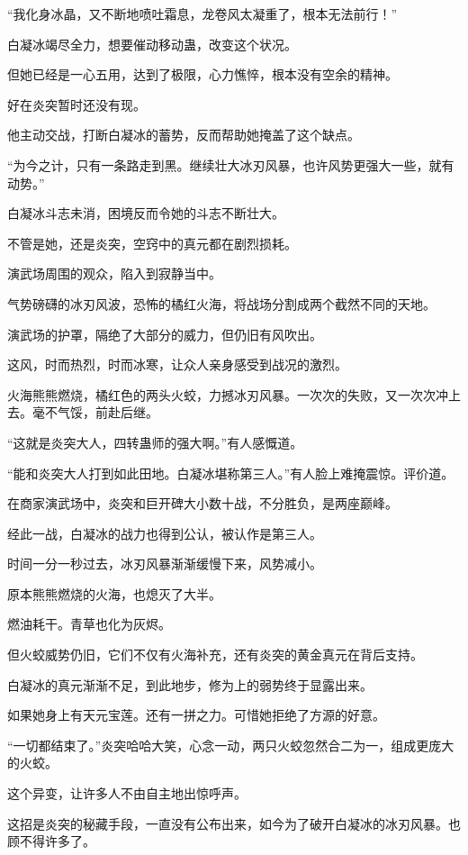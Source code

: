 \begin{this_body}
“我化身冰晶，又不断地喷吐霜息，龙卷风太凝重了，根本无法前行！”

白凝冰竭尽全力，想要催动移动蛊，改变这个状况。

但她已经是一心五用，达到了极限，心力憔悴，根本没有空余的精神。

好在炎突暂时还没有现。

他主动交战，打断白凝冰的蓄势，反而帮助她掩盖了这个缺点。

“为今之计，只有一条路走到黑。继续壮大冰刃风暴，也许风势更强大一些，就有动势。”

白凝冰斗志未消，困境反而令她的斗志不断壮大。

不管是她，还是炎突，空窍中的真元都在剧烈损耗。

演武场周围的观众，陷入到寂静当中。

气势磅礴的冰刃风波，恐怖的橘红火海，将战场分割成两个截然不同的天地。

演武场的护罩，隔绝了大部分的威力，但仍旧有风吹出。

这风，时而热烈，时而冰寒，让众人亲身感受到战况的激烈。

火海熊熊燃烧，橘红色的两头火蛟，力撼冰刃风暴。一次次的失败，又一次次冲上去。毫不气馁，前赴后继。

“这就是炎突大人，四转蛊师的强大啊。”有人感慨道。

“能和炎突大人打到如此田地。白凝冰堪称第三人。”有人脸上难掩震惊。评价道。

在商家演武场中，炎突和巨开碑大小数十战，不分胜负，是两座巅峰。

经此一战，白凝冰的战力也得到公认，被认作是第三人。

时间一分一秒过去，冰刃风暴渐渐缓慢下来，风势减小。

原本熊熊燃烧的火海，也熄灭了大半。

燃油耗干。青草也化为灰烬。

但火蛟威势仍旧，它们不仅有火海补充，还有炎突的黄金真元在背后支持。

白凝冰的真元渐渐不足，到此地步，修为上的弱势终于显露出来。

如果她身上有天元宝莲。还有一拼之力。可惜她拒绝了方源的好意。

“一切都结束了。”炎突哈哈大笑，心念一动，两只火蛟忽然合二为一，组成更庞大的火蛟。

这个异变，让许多人不由自主地出惊呼声。

这招是炎突的秘藏手段，一直没有公布出来，如今为了破开白凝冰的冰刃风暴。也顾不得许多了。


\end{this_body}
